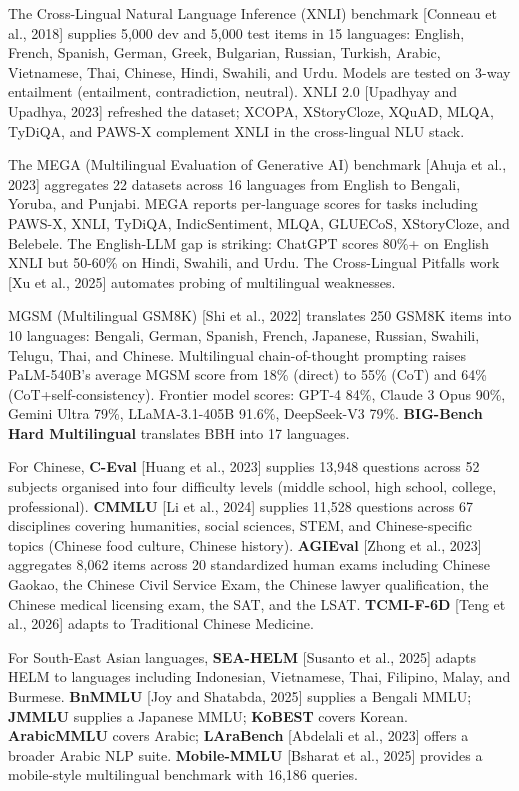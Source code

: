 The Cross-Lingual Natural Language Inference (XNLI) benchmark {[}Conneau et al., 2018{]} supplies 5,000 dev and 5,000 test items in 15 languages: English, French, Spanish, German, Greek, Bulgarian, Russian, Turkish, Arabic, Vietnamese, Thai, Chinese, Hindi, Swahili, and Urdu. Models are tested on 3-way entailment (entailment, contradiction, neutral). XNLI 2.0 {[}Upadhyay and Upadhya, 2023{]} refreshed the dataset; XCOPA, XStoryCloze, XQuAD, MLQA, TyDiQA, and PAWS-X complement XNLI in the cross-lingual NLU stack.

The MEGA (Multilingual Evaluation of Generative AI) benchmark {[}Ahuja et al., 2023{]} aggregates 22 datasets across 16 languages from English to Bengali, Yoruba, and Punjabi. MEGA reports per-language scores for tasks including PAWS-X, XNLI, TyDiQA, IndicSentiment, MLQA, GLUECoS, XStoryCloze, and Belebele. The English-LLM gap is striking: ChatGPT scores 80\%+ on English XNLI but 50-60\% on Hindi, Swahili, and Urdu. The Cross-Lingual Pitfalls work {[}Xu et al., 2025{]} automates probing of multilingual weaknesses.

MGSM (Multilingual GSM8K) {[}Shi et al., 2022{]} translates 250 GSM8K items into 10 languages: Bengali, German, Spanish, French, Japanese, Russian, Swahili, Telugu, Thai, and Chinese. Multilingual chain-of-thought prompting raises PaLM-540B's average MGSM score from 18\% (direct) to 55\% (CoT) and 64\% (CoT+self-consistency). Frontier model scores: GPT-4 84\%, Claude 3 Opus 90\%, Gemini Ultra 79\%, LLaMA-3.1-405B 91.6\%, DeepSeek-V3 79\%. \textbf{BIG-Bench Hard Multilingual} translates BBH into 17 languages.

For Chinese, \textbf{C-Eval} {[}Huang et al., 2023{]} supplies 13,948 questions across 52 subjects organised into four difficulty levels (middle school, high school, college, professional). \textbf{CMMLU} {[}Li et al., 2024{]} supplies 11,528 questions across 67 disciplines covering humanities, social sciences, STEM, and Chinese-specific topics (Chinese food culture, Chinese history). \textbf{AGIEval} {[}Zhong et al., 2023{]} aggregates 8,062 items across 20 standardized human exams including Chinese Gaokao, the Chinese Civil Service Exam, the Chinese lawyer qualification, the Chinese medical licensing exam, the SAT, and the LSAT. \textbf{TCMI-F-6D} {[}Teng et al., 2026{]} adapts to Traditional Chinese Medicine.

For South-East Asian languages, \textbf{SEA-HELM} {[}Susanto et al., 2025{]} adapts HELM to languages including Indonesian, Vietnamese, Thai, Filipino, Malay, and Burmese. \textbf{BnMMLU} {[}Joy and Shatabda, 2025{]} supplies a Bengali MMLU; \textbf{JMMLU} supplies a Japanese MMLU; \textbf{KoBEST} covers Korean. \textbf{ArabicMMLU} covers Arabic; \textbf{LAraBench} {[}Abdelali et al., 2023{]} offers a broader Arabic NLP suite. \textbf{Mobile-MMLU} {[}Bsharat et al., 2025{]} provides a mobile-style multilingual benchmark with 16,186 queries.

